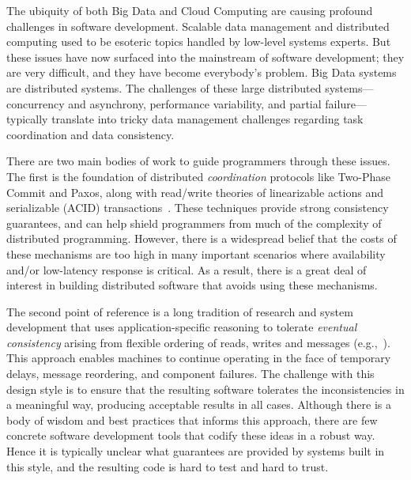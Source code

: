 The ubiquity of both Big Data and Cloud Computing are causing profound challenges in software development. Scalable data management and distributed computing used to be esoteric topics handled by low-level systems experts.  But these issues have now surfaced into the mainstream of software development; they are very difficult, and they have become everybody's problem.   Big Data systems are distributed systems.  The challenges of these large distributed systems---concurrency and asynchrony, performance variability, and partial failure---typically translate into tricky data management challenges regarding task coordination and data consistency.

There are two main bodies of work to guide programmers through these issues.  The first is the foundation of distributed \emph{coordination} protocols like Two-Phase Commit and Paxos, along with read/write theories of linearizable actions and serializable (ACID) transactions~\cite{distributedbook,grayreuter}. These techniques provide strong consistency guarantees, and can help shield programmers from much of the complexity of distributed programming. However, there is a widespread belief that the costs of these mechanisms are too high in many important scenarios where availability and/or low-latency response is critical.
As a result, there is a great deal of interest in building distributed software that avoids using these mechanisms.

The second point of reference is a long tradition of research and system development that uses application-specific reasoning to tolerate \emph{eventual consistency} arising from flexible ordering of reads, writes and messages (e.g.,~\cite{dynamo,sagas,beyond,quicksand,base,Shapiro2011b,bayou}). This approach enables machines to continue operating in the face of temporary delays, message reordering, and component failures.  
The challenge with this design style is to ensure that the resulting software tolerates the inconsistencies in a meaningful way, producing acceptable results in all cases.  Although there is a body of wisdom and best practices that informs this approach, there are few concrete software development tools that codify these ideas in a robust way.  Hence it is typically unclear what guarantees are provided by systems built in this style, and the resulting code is hard to test and hard to trust.  

